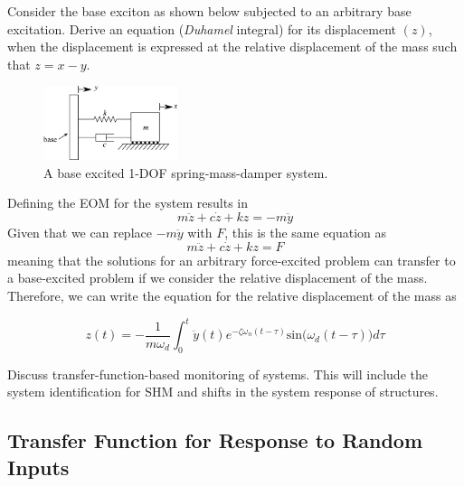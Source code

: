 \documentclass[12pt,letter]{article}
\begin{document}
\begin{example}
	
	Consider the base exciton as shown below subjected to an arbitrary base excitation. Derive an equation (\textit{Duhamel} integral) for its displacement $(z)$, when the displacement is expressed at the relative displacement of the mass such that $z = x - y$. 
	
	\begin{figure}[H]
		\centering
		\includegraphics[width=0.35\textwidth]{../figures/1_DOF_spring_dashpot_mass_horizontal_base_excited.png}
		\caption{A base excited 1-DOF spring-mass-damper system.}
	\end{figure}
	
	Defining the EOM for the system results in
	\begin{equation}
		m\ddot{z} + c \dot{z} + kz = -m\ddot{y}
	\end{equation} 	
	Given that we can replace $-m\ddot{y}$ with $F$, this is the same equation as
	\begin{equation}
		m\ddot{z} + c \dot{z} + kz = F
	\end{equation} 	
	meaning that the solutions for an arbitrary force-excited problem can transfer to a base-excited problem if we consider the relative displacement of the mass. Therefore, we can write the equation for the relative displacement of the mass as
	
	\begin{equation}
		z(t) = -\frac{1}{m \omega_d} \int_{0}^{t} \ddot{y}(t) e^{-\zeta \omega_n (t-\tau)} \text{sin}\big(\omega_d(t-\tau)\big) d \tau	
	\end{equation}
	
\end{example}

		\begin{vibration_case_study}
			Discuss transfer-function-based monitoring of systems. This will include the system identification for SHM and shifts in the system response of structures. 
		\end{vibration_case_study}

\subsection{Transfer Function for Response to Random Inputs}
\end{document}
